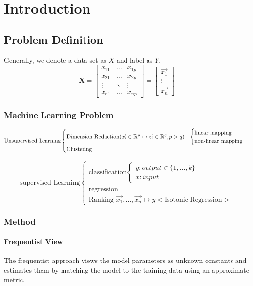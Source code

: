 \chapter{Introduction}

\section{Problem Definition}
Generally, we denote a data set as $X$ and label as $Y$.
$$\textbf{X}=
\begin{bmatrix}
	x_{11} & \dots & x_{1p} \\
	x_{21} & \dots & x_{2p} \\
	\vdots & \ddots& \vdots \\
	x_{n1} & \dots &x_{np}
\end{bmatrix} 
=
\begin{bmatrix}
	\Vec{x_1}\\
	\vdots \\
	\Vec{x_n}
\end{bmatrix}
$$
\subsection{Machine Learning Problem}
$$\text{Unsupervised Learning}
\begin{cases} 
	\text{Dimension Reduction} (\vec{x_i}\in\mathbb{R}^p\mapsto \vec{z_i}\in\mathbb{R}^q, p>q) & \begin{cases}
		\text{linear mapping} \\
		\text{non-linear mapping}
	\end{cases} \\
	\text{Clustering} & \\
\end{cases}
$$

$$
\text{supervised Learning}
\begin{cases}
	\text{classification}\begin{cases}
		y:output\in \{1,\dots,k\}\\
		x:input
	\end{cases}\\
	\text{regression}\\
	\text{Ranking } \vec{x_1},\dots,\vec{x_n}\mapsto y <\text{Isotonic Regression}>
\end{cases}
$$

\subsection{Method}
	\subsubsection{Frequentist View}
	The frequentist approach views the model parameters as unknown constants and estimates them by matching the model to the training data using an approximate metric.
	
